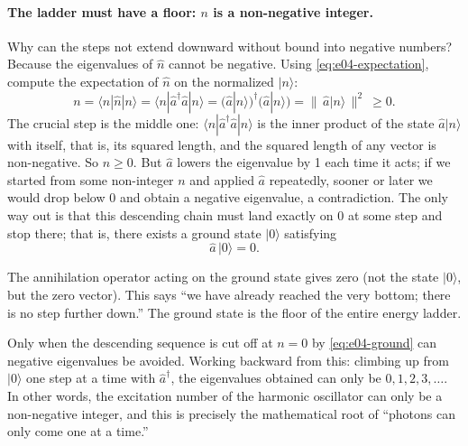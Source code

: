 \paragraph{The ladder must have a floor: \(n\) is a non-negative integer.}
Why can the steps not extend downward without bound into negative numbers? Because the eigenvalues of \(\hat n\) cannot be negative. Using \eqref{eq:e04-expectation}, compute the expectation of \(\hat n\) on the normalized \(|n\rangle\):
\[
  n=\langle n|\hat n|n\rangle=\langle n|\hat a^\dagger\hat a|n\rangle
  =\big(\hat a|n\rangle\big)^\dagger\big(\hat a|n\rangle\big)
  =\big\|\,\hat a|n\rangle\,\big\|^2\ \ge 0 .
\]
The crucial step is the middle one: \(\langle n|\hat a^\dagger\hat a|n\rangle\) is the inner product of the state \(\hat a|n\rangle\) with itself, that is, its squared length, and the squared length of any vector is non-negative. So \(n\ge0\). But \(\hat a\) lowers the eigenvalue by 1 each time it acts; if we started from some non-integer \(n\) and applied \(\hat a\) repeatedly, sooner or later we would drop below 0 and obtain a negative eigenvalue, a contradiction. The only way out is that this descending chain must land exactly on 0 at some step and stop there; that is, there exists a ground state \(|0\rangle\) satisfying
\begin{equation}
  \hat a\,|0\rangle=0 .
  \label{eq:e04-ground}
\end{equation}
\begin{formulaexplain}
The annihilation operator acting on the ground state gives zero (not the state \(|0\rangle\), but the zero vector). This says ``we have already reached the very bottom; there is no step further down.'' The ground state is the floor of the entire energy ladder.
\end{formulaexplain}
Only when the descending sequence is cut off at \(n=0\) by \eqref{eq:e04-ground} can negative eigenvalues be avoided. Working backward from this: climbing up from \(|0\rangle\) one step at a time with \(\hat a^\dagger\), the eigenvalues obtained can only be \(0,1,2,3,\ldots\). In other words, the excitation number of the harmonic oscillator can only be a non-negative integer, and this is precisely the mathematical root of ``photons can only come one at a time.''

